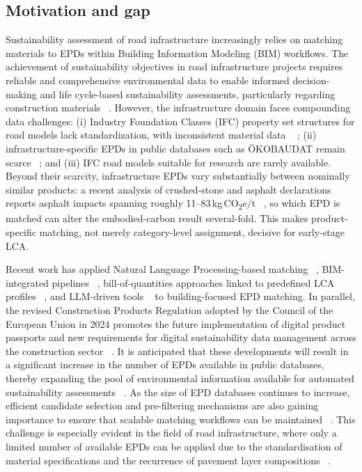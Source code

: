 \documentclass[10pt, a4paper, twocolumn]{article}
\begin{document}
\subsection{Motivation and gap}

Sustainability assessment of road infrastructure increasingly relies on matching materials to EPDs within Building Information Modeling (BIM) workflows. The achievement of sustainability objectives in road infrastructure projects requires reliable and comprehensive environmental data to enable informed decision-making and life cycle-based sustainability assessments, particularly regarding construction materials ~\cite{Kaus.2025}. However, the infrastructure domain faces compounding data challenges: (i) Industry Foundation Classes (IFC) property set structures for road models lack standardization, with inconsistent material data ~\cite{Wastiels.2019,PotrcObrecht.2020} ; (ii) infrastructure-specific EPDs in public databases such as ÖKOBAUDAT remain scarce ~\cite{Kaus.2025}; and (iii) IFC road models suitable for research are rarely available.
Beyond their scarcity, infrastructure EPDs vary substantially between nominally
similar products: a recent analysis of crushed-stone and asphalt declarations
reports asphalt impacts spanning roughly 11--83\,kg\,CO\textsubscript{2}e/t
~\cite{Petrovic.2025}, so which EPD is matched can alter the embodied-carbon result
several-fold. This makes product-specific matching, not merely category-level
assignment, decisive for early-stage LCA.

Recent work has applied Natural Language Processing-based matching ~\cite{Forth.2023}, BIM-integrated pipelines ~\cite{Hermann.2024}, bill-of-quantities approaches linked to predefined LCA profiles ~\cite{J.HofmeyerK.ForthS.EsserA.Borrmann.}, and LLM-driven tools ~\cite{Petrosa.2025} to building-focused EPD matching. In parallel, the revised Construction Products Regulation adopted by the Council of the European Union in 2024 promotes the future implementation of digital product passports and new requirements for digital sustainability data management across the construction sector ~\cite{CounciloftheEU.2024}. It is anticipated that these developments will result in a significant increase in the number of EPDs available in public databases, thereby expanding the pool of environmental information available for automated sustainability assessments ~\cite{PublicationsOfficeoftheEuropeanUnionL2985LuxembourgLUXEMBOURG.2024}. As the size of EPD databases continues to increase, efficient candidate selection and pre-filtering mechanisms are also gaining importance to ensure that scalable matching workflows can be maintained ~\cite{Petrosa.2025}. This challenge is especially evident in the field of road infrastructure, where only a limited number of available EPDs can be applied due to the standardisation of material specifications and the recurrence of pavement layer compositions ~\cite{ Kaus.2025, Petrosa.2025}. 
\end{document}
